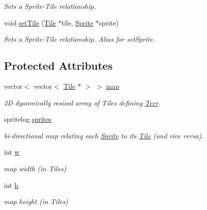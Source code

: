 \begin{DoxyCompactItemize}
\begin{DoxyCompactList}\small\item\em Sets a Sprite-\/\+Tile relationship. \end{DoxyCompactList}\item 
void \hyperlink{class_terr_ad1bfd1e758bb709e1ab096d3a1853497}{set\+Tile} (\hyperlink{class_tile}{Tile} $\ast$tile, \hyperlink{class_sprite}{Sprite} $\ast$sprite)\hypertarget{class_terr_ad1bfd1e758bb709e1ab096d3a1853497}{}\label{class_terr_ad1bfd1e758bb709e1ab096d3a1853497}

\begin{DoxyCompactList}\small\item\em Sets a Sprite-\/\+Tile relationship. Alias for set\+Sprite. \end{DoxyCompactList}\end{DoxyCompactItemize}
\subsection*{Protected Attributes}
\begin{DoxyCompactItemize}
\item 
vector$<$ vector$<$ \hyperlink{class_tile}{Tile} $\ast$ $>$ $>$ \hyperlink{class_terr_a35de374972704b3d92e76b4bc8e67a9c}{map}\hypertarget{class_terr_a35de374972704b3d92e76b4bc8e67a9c}{}\label{class_terr_a35de374972704b3d92e76b4bc8e67a9c}

\begin{DoxyCompactList}\small\item\em 2D dyanmically resized array of Tiles defining \hyperlink{class_terr}{Terr}. \end{DoxyCompactList}\item 
spritelog \hyperlink{class_terr_a633f21d6e20c549f8006104ae4363bea}{sprites}\hypertarget{class_terr_a633f21d6e20c549f8006104ae4363bea}{}\label{class_terr_a633f21d6e20c549f8006104ae4363bea}

\begin{DoxyCompactList}\small\item\em bi-\/directional map relating each \hyperlink{class_sprite}{Sprite} to its \hyperlink{class_tile}{Tile} (and vice versa). \end{DoxyCompactList}\item 
int \hyperlink{class_terr_af1d43d8b2b20b19d005626831c1335fb}{w}\hypertarget{class_terr_af1d43d8b2b20b19d005626831c1335fb}{}\label{class_terr_af1d43d8b2b20b19d005626831c1335fb}

\begin{DoxyCompactList}\small\item\em map width (in Tiles) \end{DoxyCompactList}\item 
int \hyperlink{class_terr_aa2f06b09cb8abd0fda4abb2b696f6885}{h}\hypertarget{class_terr_aa2f06b09cb8abd0fda4abb2b696f6885}{}\label{class_terr_aa2f06b09cb8abd0fda4abb2b696f6885}

\begin{DoxyCompactList}\small\item\em map height (in Tiles) \end{DoxyCompactList}\end{DoxyCompactItemize}


